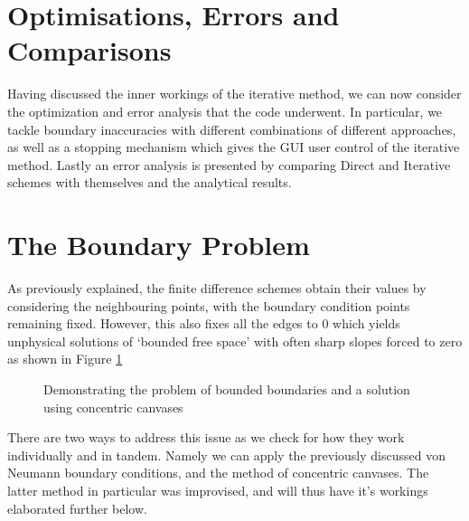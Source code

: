 \documentclass[a4paper]{article}
\begin{document}

\section{Optimisations, Errors and Comparisons}
Having discussed the inner workings of the iterative method, we can now 
consider the optimization and error analysis that the code underwent. In 
particular, we tackle boundary inaccuracies with different combinations of 
different approaches, as well as a stopping mechanism which gives the GUI user 
control of the iterative method. Lastly an error analysis is presented by 
comparing Direct and Iterative schemes with themselves and the analytical 
results. 
    
\section{The Boundary Problem}
As previously explained, the finite difference schemes obtain their values by 
considering the neighbouring points, with the boundary condition points 
remaining fixed. However, this also fixes all the edges to 0 which yields 
unphysical solutions  of `bounded free space' with often sharp slopes forced to 
zero as shown in Figure \ref{fig:boundprob}
\begin{figure}[!h]
  \centering
  
\hfill
  \hfill
  \caption{Demonstrating the problem of bounded boundaries and a solution using 
concentric canvases}
  \label{fig:boundprob}
\end{figure}
There are two ways to address this issue as we check for how they work
individually and in tandem. Namely we can apply the previously discussed von 
Neumann boundary conditions, and the method of concentric canvases. The latter 
method in particular was improvised, and will thus have it's workings 
elaborated further below.
\end{document}

